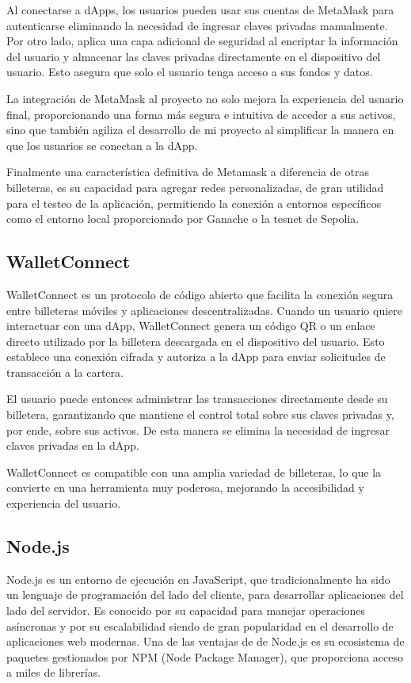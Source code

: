 Al conectarse a dApps, los usuarios pueden usar sus cuentas de MetaMask para autenticarse eliminando la necesidad de ingresar claves privadas manualmente. Por otro lado, aplica una capa adicional de seguridad al encriptar la información del usuario y almacenar las claves privadas directamente en el dispositivo del usuario. Esto asegura que solo el usuario tenga acceso a sus fondos y datos.

La integración de MetaMask al proyecto no solo mejora la experiencia del usuario final, proporcionando una forma más segura e intuitiva de acceder a sus activos, sino que también agiliza el desarrollo de mi proyecto al simplificar la manera en que los usuarios se conectan a la dApp.

Finalmente una característica definitiva de Metamask a diferencia de otras billeteras, es su capacidad para agregar redes personalizadas, de gran utilidad para el testeo de la aplicación, permitiendo la conexión a entornos específicos como el entorno local proporcionado por Ganache o la tesnet de Sepolia.


\subsection{WalletConnect}

WalletConnect es un protocolo de código abierto que facilita la conexión segura entre billeteras móviles y aplicaciones descentralizadas.
Cuando un usuario quiere interactuar con una dApp, WalletConnect genera un código QR o un enlace directo utilizado por la billetera descargada en el dispositivo del usuario. Esto establece una conexión cifrada y autoriza a la dApp para enviar solicitudes de transacción a la cartera.

El usuario puede entonces administrar las transacciones directamente desde su billetera, garantizando que mantiene el control total sobre sus claves privadas y, por ende, sobre sus activos. 
De esta manera se elimina la necesidad de ingresar claves privadas en la dApp.

WalletConnect es compatible con una amplia variedad de billeteras, lo que la convierte en una herramienta muy poderosa, mejorando la accesibilidad y experiencia del usuario.


\subsection{Node.js}

Node.js es un entorno de ejecución en JavaScript, que tradicionalmente ha sido un lenguaje de programación del lado del cliente, para desarrollar aplicaciones del lado del servidor. Es conocido por su capacidad para manejar operaciones asíncronas y por su escalabilidad siendo de gran popularidad en el desarrollo de aplicaciones web modernas. Una de las ventajas de de Node.js es su ecosistema de paquetes gestionados por NPM (Node Package Manager), que proporciona acceso a miles de librerías.

